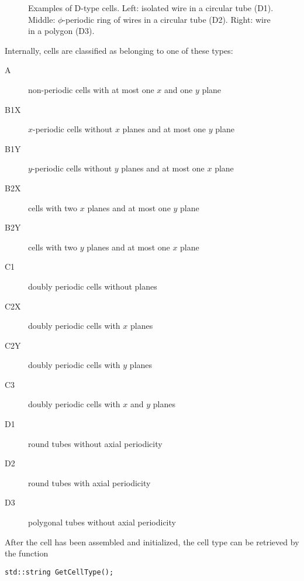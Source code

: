 \begin{figure}
  \centering
  \caption{Examples of D-type cells. Left: isolated wire in a circular tube (D1). Middle: $\phi$-periodic ring of wires in a circular tube (D2). Right: wire in a polygon (D3).}
  \label{Fig:CellTypeD}
\end{figure}

Internally, cells are classified as belonging to one of these types:
\begin{description}
  \item[A]
  non-periodic cells with at most one \(x\) and one \(y\) plane
  \item[B1X]
  \(x\)-periodic cells without \(x\) planes and at most one \(y\) plane
  \item[B1Y]
  \(y\)-periodic cells without \(y\) planes and at most one \(x\) plane
  \item[B2X]
  cells with two \(x\) planes and at most one \(y\) plane
  \item[B2Y]
  cells with two \(y\) planes and at most one \(x\) plane
  \item[C1]
  doubly periodic cells without planes
  \item[C2X]
  doubly periodic cells with \(x\) planes
  \item[C2Y]
  doubly periodic cells with \(y\) planes
  \item[C3]
  doubly periodic cells with \(x\) and \(y\) planes
  \item[D1]
  round tubes without axial periodicity
  \item[D2]
  round tubes with axial periodicity
  \item[D3]
  polygonal tubes without axial periodicity
\end{description}

After the cell has been assembled and initialized, the cell type can be 
retrieved by the function
\begin{lstlisting}
std::string GetCellType();
\end{lstlisting}

